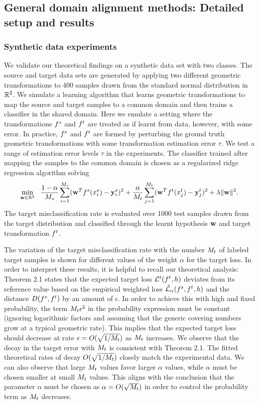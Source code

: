 \documentclass[review,supplement,onefignum,onetabnum]{siamonline250211}
\begin{document}
\subsection{General domain alignment methods: Detailed setup and results}
\label{ssec_exp_gen_da_detailed}

\subsubsection{Synthetic data experiments}

We validate our theoretical findings on a synthetic data set with two classes. The source and target data sets are generated by applying two different geometric transformations to 400 samples drawn from the standard normal distribution in $\mathbb{R}^2$. We simulate a learning algorithm that learns geometric transformations to map the source and target samples to a common domain and then trains a classifier in the shared domain. Here we emulate a setting where the transformations $f^s$ and $f^t$ are treated as if learnt from data, however, with some error. In practice,  $f^s$ and $f^t$ are formed by perturbing the ground truth geometric transformations with some transformation estimation error $\tau$.  We test a range of estimation error levels  $\tau$ in the experiments. The classifier trained after mapping the samples to the common domain is chosen as a regularized ridge regression algorithm solving
%
\begin{equation*}
\min_{\wvect \in \R^2} \ \  \frac{1-\alpha}{\Ms} \sum_{i=1}^{\Ms} (\wvect ^T \fs(\xis) - \yis)^2 
+ \frac{\alpha}{\Mt} \sum_{j=1}^{\Mt} (\wvect ^T \ft(\xjt) - \yjt)^2  + \lambda \| \wvect \|^2 .
\end{equation*}
%
The target misclassification rate is evaluated over 1000 test samples drawn from the target distribution and classified through the learnt hypothesis $\mathbf{w}$ and target transformation $f^t$.

The variation of the target misclassification rate with the number $M_t$ of labeled target samples is shown for different values of the weight $\alpha$ for the target loss. In order to interpret these results, it is helpful to recall our theoretical analysis: Theorem 2.1 states that the expected target loss $\mathcal{L}^t(f^t, h) $ deviates from its reference value based on the empirical weighted loss $\hat{\mathcal{L}}_{\alpha}(f^s, f^t, h)$ and the distance $D(f^s, f^t)$ by an amount of $\epsilon$. In order to achieve this with high and fixed probability, the term $M_t \epsilon^2$ in the probability expression must be constant (ignoring logarithmic factors and assuming that the generic covering numbers grow at a typical geometric rate). This implies that the expected target loss should decrease at rate $\epsilon = O(\sqrt{1/M_t}) $ as $M_t$ increases. We observe that the decay in the target error with  $M_t$ is consistent with Theorem 2.1. The fitted theoretical rates of decay  $O(\sqrt{1/M_t})$ closely match the experimental data.  We can also observe that large $M_t$ values favor larger $\alpha$ values, while $\alpha$ must be chosen smaller at small $M_t$ values. This aligns with the conclusion that the parameter $\alpha$ must be chosen as  $\alpha = O(\sqrt{M_t})$ in order to control the probability term as $M_t$ decreases.
\end{document}
